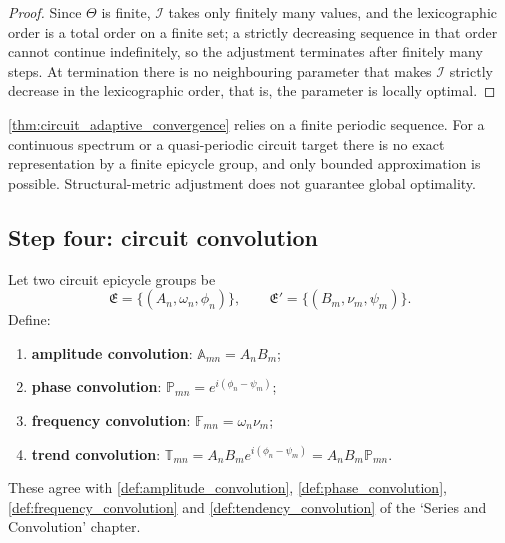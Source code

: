 \begin{proof}
Since $\Theta$ is finite, $\mathcal I$ takes only finitely many values, and the lexicographic order is a total order on a finite set; a strictly decreasing sequence in that order cannot continue indefinitely, so the adjustment terminates after finitely many steps. At termination there is no neighbouring parameter that makes $\mathcal I$ strictly decrease in the lexicographic order, that is, the parameter is locally optimal.
\end{proof}

\begin{remark}\label{rem:circuit_adaptive_boundary}
\cref{thm:circuit_adaptive_convergence} relies on a finite periodic sequence. For a continuous spectrum or a quasi-periodic circuit target there is no exact representation by a finite epicycle group, and only bounded approximation is possible. Structural-metric adjustment does not guarantee global optimality.
\end{remark}

\subsection{Step four: circuit convolution}

\begin{definition}\label{def:circuit_convolution_types}
Let two circuit epicycle groups be
\[
\mathfrak E=\{(A_n,\omega_n,\phi_n)\},\qquad
\mathfrak E'=\{(B_m,\nu_m,\psi_m)\}.
\]
Define:
\begin{enumerate}[label=(\roman*)]
    \item \textbf{amplitude convolution}: $\mathbb A_{mn}=A_nB_m$;
    \item \textbf{phase convolution}: $\mathbb P_{mn}=e^{i(\phi_n-\psi_m)}$;
    \item \textbf{frequency convolution}: $\mathbb F_{mn}=\omega_n\nu_m$;
    \item \textbf{trend convolution}: $\mathbb T_{mn}=A_nB_m e^{i(\phi_n-\psi_m)}=A_nB_m\mathbb P_{mn}$.
\end{enumerate}
These agree with \cref{def:amplitude_convolution}, \cref{def:phase_convolution}, \cref{def:frequency_convolution} and \cref{def:tendency_convolution} of the `Series and Convolution' chapter.
\end{definition}

